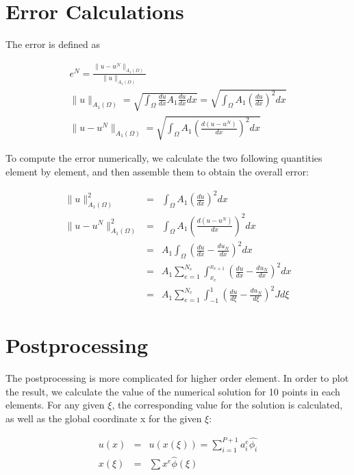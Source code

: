 \documentclass[paper=a4, fontsize=11pt]{article} %
\begin{document}
\section{Error Calculations}
The error is defined as 

\begin{eqnarray}
e^N = \frac{\| u -u^N \| _{A_1(\Omega)}} {\| u \| _{A_1 (\Omega)}} \nonumber\\
\| u \| _{A_1 (\Omega)} = \sqrt{\int_{\Omega} \frac{du}{dx} A_1 \frac{du}{dx} dx} = \sqrt{\int_{\Omega} A_1(\frac{du}{dx})^2 dx}\nonumber\\
\| u -u^N \| _{A_1(\Omega)} = \sqrt{\int_{\Omega} A_1 (\frac{d(u-u^N)}{dx})^2 dx}
\end{eqnarray}

To compute the error numerically, we calculate the two following quantities element by element, and then assemble them to obtain the overall error:

\begin{eqnarray}
\| u \| _{A_1 (\Omega)}^2 &=&\int_{\Omega} A_1(\frac{du}{dx})^2 dx\nonumber\\
\| u -u^N \| _{A_1(\Omega)} ^2 &=& \int_{\Omega} A_1 (\frac{d(u-u^N)}{dx})^2 dx\nonumber\\
&=& A_1 \int_{\Omega} (\frac{du}{dx} - \frac{du_N}{dx})^2 dx\nonumber\\
&=& A_1 \sum_{e=1}^{N_e} \int_{x_e}^{x_{e+1}} (\frac{du}{dx} - \frac{du_N}{dx})^2 dx \nonumber\\
&=& A_1 \sum_{e=1}^{N_e} \int_{-1}^{1} (\frac{du}{d\xi} - \frac{du_N}{d\xi})^2 J d\xi
\end{eqnarray}

\section{Postprocessing}
The postprocessing is more complicated for higher order element. In order to plot the result, we calculate the value of the numerical solution for 10 points in each elements. For any given $\xi$, the corresponding value for the solution is calculated, as well as the global coordinate x for the given $\xi$:

\begin{eqnarray}
 u(x) &=& u(x(\xi))=\sum_{i=1}^{P+1} a_i^e \hat{\phi_i}\nonumber\\
 x(\xi) &=& \sum x^e \hat{\phi}(\xi)
 \end{eqnarray} 
\end{document}
